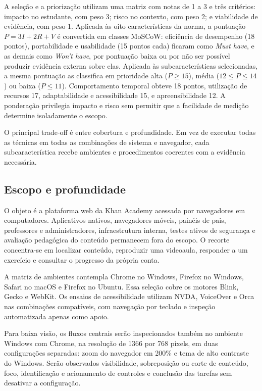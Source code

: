 A seleção e a priorização utilizam uma matriz com notas de 1 a 3 e
três critérios: impacto no estudante, com peso 3; risco no contexto,
com peso 2; e viabilidade de evidência, com peso 1. Aplicada às oito
características da norma, a pontuação $P=3I+2R+V$ é convertida em
classes MoSCoW: eficiência de desempenho (18 pontos), portabilidade e
usabilidade (15 pontos cada) ficaram como \textit{Must have}, e as
demais como \textit{Won't have}, por pontuação baixa ou por não ser
possível produzir evidência externa sobre elas. Aplicada às
subcaracterísticas selecionadas, a mesma pontuação as classifica em
prioridade alta ($P\geq15$), média ($12\leq P\leq14$) ou baixa
($P\leq11$).
Comportamento temporal obteve 18 pontos, utilização de recursos 17,
adaptabilidade e acessibilidade 15, e apreensibilidade 12. A
ponderação privilegia impacto e risco sem permitir que a facilidade
de medição determine isoladamente o escopo.

O principal trade-off é entre cobertura e profundidade. Em vez de
executar todas as técnicas em todas as combinações de sistema e
navegador, cada subcaracterística recebe ambientes e procedimentos
coerentes com a evidência necessária.

\subsection{Escopo e profundidade}

O objeto é a plataforma web da Khan Academy acessada por navegadores
em computadores. Aplicativos nativos, navegadores móveis, painéis de
pais, professores e administradores, infraestrutura interna, testes
ativos de segurança e avaliação pedagógica do conteúdo permanecem
fora do escopo. O recorte concentra-se em localizar conteúdo,
reproduzir uma videoaula, responder a um exercício e consultar o
progresso da própria conta.

A matriz de ambientes contempla Chrome no Windows, Firefox no
Windows, Safari no macOS e Firefox no Ubuntu. Essa seleção cobre os
motores Blink, Gecko e WebKit. Os ensaios de acessibilidade utilizam
NVDA, VoiceOver e Orca nas combinações compatíveis, com navegação por
teclado e inspeção automatizada apenas como apoio.

Para baixa visão, os fluxos centrais serão inspecionados também no
ambiente Windows com Chrome, na resolução de 1366 por 768 pixels, em
duas configurações separadas: zoom do navegador em 200\% e tema de alto
contraste do Windows. Serão observados visibilidade, sobreposição ou
corte de conteúdo, foco, identificação e acionamento de controles e
conclusão das tarefas sem desativar a configuração.

